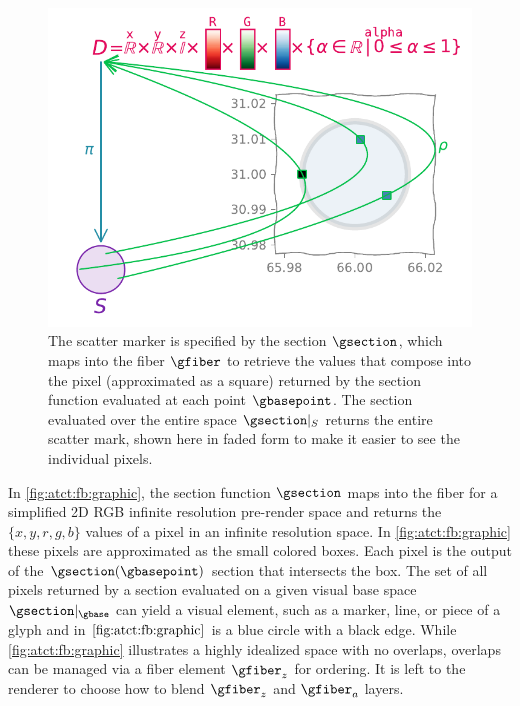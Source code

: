 \documentclass[journal]{IEEEtran}
\theoremstyle{definition}
\theoremstyle{remark}
\begin{document}
\begin{figure}[]
  \includegraphics[width=1\columnwidth]{fb_rho.pdf}
  \caption{The scatter marker is specified by the section $\gsection$, which maps into the fiber $\gfiber$ to retrieve the values that compose into the pixel (approximated as a square) returned by the section function evaluated at each point $\gbasepoint$. The section evaluated over the entire space $\gsection\vert_{S}$ returns the entire scatter mark, shown here in faded form to make it easier to see the individual pixels.
  \label{fig:atct:fb:graphic}}
\end{figure}

In \autoref{fig:atct:fb:graphic}, the section function $\gsection$ maps into the fiber for a simplified 2D RGB infinite resolution pre-render space and returns the $\{x,y,r,g,b\}$ values of a pixel in an infinite resolution space. In \autoref{fig:atct:fb:graphic} these pixels are approximated as the small colored boxes. Each pixel is the output of the $\gsection(\gbasepoint)$ section that intersects the box. The set of all pixels returned by a section evaluated on a given visual base space $\gsection|_{\gbase}$ can yield a visual element, such as a marker, line, or piece of a glyph and in $\autoref{fig:atct:fb:graphic}$ is a blue circle with a black edge. While \autoref{fig:atct:fb:graphic} illustrates a highly idealized space with no overlaps, overlaps can be managed via a fiber element $\gfiber_{z}$ for ordering. It is left to the renderer to choose how to blend $\gfiber_{z}$ and $\gfiber_{a}$ layers.
\end{document}
